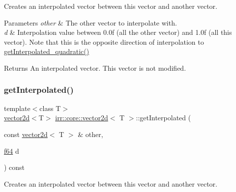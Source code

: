 Creates an interpolated vector between this vector and another vector. 


\begin{DoxyParams}{Parameters}
{\em other} & The other vector to interpolate with. \\
\hline
{\em d} & Interpolation value between 0.\+0f (all the other vector) and 1.\+0f (all this vector). Note that this is the opposite direction of interpolation to \hyperlink{classirr_1_1core_1_1vector2d_aa4bfe9ae4f1e354eeac2ee8d9c2ca7fd}{get\+Interpolated\+\_\+quadratic()} \\
\hline
\end{DoxyParams}
\begin{DoxyReturn}{Returns}
An interpolated vector. This vector is not modified. 
\end{DoxyReturn}
\mbox{\label{classirr_1_1core_1_1vector2d_ac800722ea56bf8878dc7b67d490464c3}} 
\subsubsection{\texorpdfstring{get\+Interpolated()}{getInterpolated()}\hspace{0.1cm}{\footnotesize\ttfamily [2/2]}}
{\footnotesize\ttfamily template$<$class T$>$ \\
\hyperlink{classirr_1_1core_1_1vector2d}{vector2d}$<$T$>$ \hyperlink{classirr_1_1core_1_1vector2d}{irr\+::core\+::vector2d}$<$ T $>$\+::get\+Interpolated (\begin{DoxyParamCaption}\item[{const \hyperlink{classirr_1_1core_1_1vector2d}{vector2d}$<$ T $>$ \&}]{other,  }\item[{\hyperlink{namespaceirr_a1325b02603ad449f92c68fc640af9b28}{f64}}]{d }\end{DoxyParamCaption}) const\hspace{0.3cm}{\ttfamily [inline]}}



Creates an interpolated vector between this vector and another vector. 



